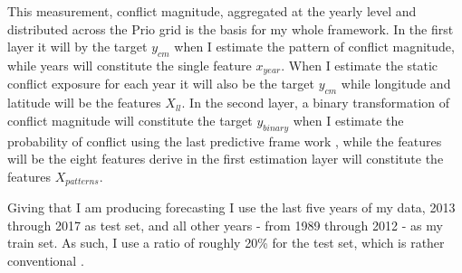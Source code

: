 \documentclass[a4paper]{article}
\begin{document}
This measurement, conflict magnitude, aggregated at the yearly level and distributed across the Prio grid is the basis for my whole framework. In the first layer it will by the target $y_{cm}$ when I estimate the pattern of conflict magnitude, while years will constitute the single feature $x_{year}$. When I estimate the static conflict exposure for each year it will also be the target $y_{cm}$ while longitude and latitude will be the features $X_{ll}$. In the second layer, a binary transformation of conflict magnitude will constitute the target $y_{binary}$ when I estimate the probability of conflict using the last predictive frame work , while the features will be the eight features derive in the first estimation layer will constitute the features $X_{patterns}$.\par

Giving that I am producing forecasting I use the last five years of my data, 2013 through 2017 as test set, and all other years - from 1989 through 2012 - as my train set.  As such, I use a ratio of roughly 20\% for the test set, which is rather conventional \citep{Friedman_2001, Ward_Greenhill_Bakke_2010}.\par


\end{document}
